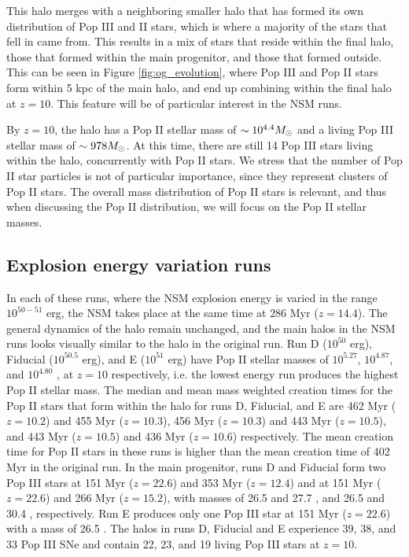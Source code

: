 \documentclass[fleqn,usenatbib]{mnras}
\begin{document}
This halo merges with a neighboring smaller halo that has formed its own distribution of Pop III and II stars, which is where a majority of the stars that fell in came from. This results in a mix of stars that reside within the final halo, those that formed within the main progenitor, and those that formed outside. This can be seen in Figure \ref{fig:og_evolution}, where Pop III and Pop II stars form within 5 kpc of the main halo, and end up combining within the final halo at $z = 10$. This feature will be of particular interest in the NSM runs. 

By $z = 10$, the halo has a Pop II stellar mass of $\sim 10^{4.4} \Ms$ and a living Pop III stellar mass of $\sim 978 \Ms$. At this time, there are still 14 Pop III stars living within the halo, concurrently with Pop II stars. We stress that the number of Pop II star particles is not of particular importance, since they represent clusters of Pop II stars. The overall mass distribution of Pop II stars is relevant, and thus when discussing the Pop II distribution, we will focus on the Pop II stellar masses. 

\subsection{Explosion energy variation runs} \label{sec:energy_vary}

In each of these runs, where the NSM explosion energy is varied in the range $10^{50 - 51}$ erg, the NSM takes place at the same time at $286$ Myr ($z = 14.4$). The general dynamics of the halo remain unchanged, and the main halos in the NSM runs looks visually similar to the halo in the original run. Run D ($10^{50}$ erg), Fiducial ($10^{50.5}$ erg), and E ($10^{51}$ erg) have Pop II stellar masses of $10^{5.27}$, $10^{4.87}$, and $10^{4.80}$ \Ms{}, at $z = 10$ respectively, i.e. the lowest energy run produces the highest Pop II stellar mass. The median and mean mass weighted creation times for the Pop II stars that form within the halo for runs D, Fiducial, and E are 462 Myr ($z = 10.2$) and 455 Myr ($z = 10.3$), 456 Myr ($z = 10.3$) and 443 Myr ($z = 10.5$), and 443 Myr ($z = 10.5$) and 436 Myr ($z = 10.6$) respectively. The mean creation time for Pop II stars in these runs is higher than the mean creation time of 402 Myr in the original run. In the main progenitor, runs D and Fiducial form two Pop III stars at 151 Myr ($z = 22.6$) and 353 Myr ($z = 12.4$) and at 151 Myr ($z = 22.6$) and 266 Myr ($z = 15.2$), with masses of 26.5 \Ms{} and 27.7 \Ms{}, and 26.5 \Ms{} and 30.4 \Ms, respectively. Run E produces only one Pop III star at 151 Myr ($z = 22.6$) with a mass of 26.5 \Ms{}. The halos in runs D, Fiducial and E experience 39, 38, and 33 Pop III SNe and contain 22, 23, and 19 living Pop III stars at $z = 10$. 
\end{document}
